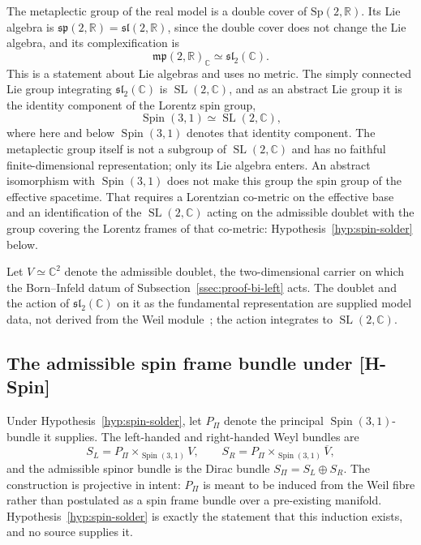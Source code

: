 \documentclass[11pt,a4paper]{article}
\theoremstyle{definition}
\theoremstyle{remark}
\newcommand{\Spin}{\operatorname{Spin}}
\newcommand{\SL}{\operatorname{SL}}
\begin{document}
    The metaplectic group of the real model is a double cover of $\mathrm{Sp}(2,\mathbb{R})$.
    Its Lie algebra is $\mathfrak{sp}(2,\mathbb{R}) = \mathfrak{sl}(2,\mathbb{R})$, since the double cover
    does not change the Lie algebra, and its complexification is
    \begin{equation}
      \label{eq:metaplectic-complexification}
      \mathfrak{mp}(2,\mathbb{R})_{\mathbb{C}} \simeq \mathfrak{sl}_2(\mathbb{C}).
    \end{equation}
    This is a statement about Lie algebras and uses no metric.
    The simply connected Lie group integrating $\mathfrak{sl}_2(\mathbb{C})$ is $\SL(2,\mathbb{C})$, and as an
    abstract Lie group it is the identity component of the Lorentz spin group,
    \begin{equation}
      \label{eq:spin-group-lorentzian}
      \Spin(3,1) \simeq \SL(2,\mathbb{C}),
    \end{equation}
    where here and below $\Spin(3,1)$ denotes that identity component.
    The metaplectic group itself is not a subgroup of $\SL(2,\mathbb{C})$ and has no faithful
    finite-dimensional representation; only its Lie algebra enters.
    An abstract isomorphism with $\Spin(3,1)$ does not make this group the spin group of the effective
    spacetime.
    That requires a Lorentzian co-metric on the effective base and an identification of the
    $\SL(2,\mathbb{C})$ acting on the admissible doublet with the group covering the Lorentz frames of that
    co-metric: Hypothesis~\ref{hyp:spin-solder} below.

    Let $V \simeq \mathbb{C}^2$ denote the admissible doublet, the two-dimensional carrier on which the
    Born--Infeld datum of Subsection~\ref{ssec:proof-bi-left} acts.
    The doublet and the action of $\mathfrak{sl}_2(\mathbb{C})$ on it as the fundamental representation are
    supplied model data, not derived from the Weil module~\cite{Beau2026a27,Beau2026a34}; the action
    integrates to $\SL(2,\mathbb{C})$.

  \subsection{The admissible spin frame bundle under [H-Spin]}
    \label{ssec:spin-frame-bundle}

    Under Hypothesis~\ref{hyp:spin-solder}, let $P_\Pi$ denote the principal $\Spin(3,1)$-bundle it
    supplies.
    The left-handed and right-handed Weyl bundles are
    \[
      S_L = P_\Pi \times_{\Spin(3,1)} V,
      \qquad
      S_R = P_\Pi \times_{\Spin(3,1)} \overline{V},
    \]
    and the admissible spinor bundle is the Dirac bundle $S_\Pi = S_L \oplus S_R$.
    The construction is projective in intent: $P_\Pi$ is meant to be induced from the Weil fibre rather
    than postulated as a spin frame bundle over a pre-existing manifold.
    Hypothesis~\ref{hyp:spin-solder} is exactly the statement that this induction exists, and no source
    supplies it.
\end{document}
